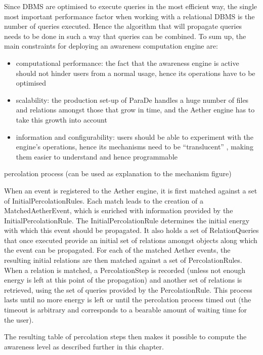 \documentclass{ecscw2007}
\begin{document}
Since DBMS are optimised to execute queries in the most efficient way, the single most important performance factor when working with a relational DBMS is the number of queries executed. Hence the algorithm that will propagate queries needs to be done in such a way that queries can be combined.
To sum up, the main constraints for deploying an awareness computation engine are:
\begin{itemize}
     \item computational performance: the fact that the awareness engine is active should not hinder users from a normal usage, hence its operations have to be optimised
     \item scalability: the production set-up of ParaDe handles a huge number of files and relations amongst those that grow in time, and the Aether engine has to take this growth into account
     \item information and configurability: users should be able to experiment with the engine’s operations, hence its mechanisms need to be “translucent” , making them easier to understand and hence programmable
\end{itemize}



percolation process (can be used as explanation to the mechanism figure)

When an event is registered to the Aether engine, it is first matched against a set of InitialPercolationRules. Each match leads to the creation of a MatchedAetherEvent, which is enriched with information provided by the InitialPercolationRule. The InitialPercolationRule determines the initial energy with which this event should be propagated. It also holds a set of RelationQueries that once executed provide an initial set of relations amongst objects along which the event can be propagated.
For each of the matched Aether events, the resulting initial relations are then matched against a set of PercolationRules. When a relation is matched, a PercolationStep is recorded (unless not enough energy is left at this point of the propagation) and another set of relations is retrieved, using the set of queries provided by the PercolationRule. This process lasts until no more energy is left or until the percolation process timed out (the timeout is arbitrary and corresponds to a bearable amount of waiting time for the user).

The resulting table of percolation steps then makes it possible to compute the awareness level as described further in this chapter.
\end{document}
